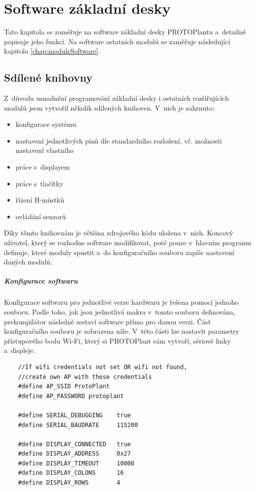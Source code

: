 \chapter{Software základní desky}
Tato kapitola se zaměřuje na software základní desky PROTOPlantu a~detailně popisuje jeho funkci.
Na software ostatních modulů se zaměřuje následu\-jí\-cí kapitola \ref{chap:moduleSoftware}.

\fxnote[author=PŠ]{\textcolor{mygreen}{Přidat pár ukázek kódu.}}


\section{Sdílené knihovny}
Z~důvodu usnadnění programování základní desky i ostatních rozšiřujících modulů jsem vytvořil několik sdílených knihoven. 
V~nich je zahrnuto:
\begin{itemize}
    \item konfigurace systému
    \item nastavení jednotlivých pinů dle standardního rozložení, vč. možnosti nastavení vlastního
    \item práce s~displayem
    \item práce s~tlačítky
    \item řízení H-můstků
    \item ovládání senzorů
\end{itemize}
Díky těmto knihovnám je většina zdrojového kódu uložena v~nich. 
Koncový uživatel, který se rozhodne software modifikovat, poté pouze v~hlavním programu definuje, které moduly spustit a~do konfiguračního souboru zapíše nastavení daných modulů.

\paragraph{Konfigurace softwaru}
Konfigurace softwaru pro jednotlivé verze hardwaru je řešena pomocí jednoho souboru.
Podle toho, jak jsou jednotlivá makra v~tomto souboru definována, prekompilátor následně sestaví software přímo pro danou verzi.
Část konfiguračního souboru je zobrazena níže.
V~této části lze nastavit parametry přístupového bodu Wi-Fi, který si PROTOPlant sám vytvoří, sériové linky a~displeje.
\begin{lstlisting}
    //If wifi credentials not set OR wifi not found, 
    //create own AP with these credentials
    #define AP_SSID ProtoPlant
    #define AP_PASSWORD protoplant
    
    #define SERIAL_DEBUGGING    true
    #define SERIAL_BAUDRATE     115200
    
    #define DISPLAY_CONNECTED   true
    #define DISPLAY_ADDRESS     0x27
    #define DISPLAY_TIMEOUT     10000
    #define DISPLAY_COLONS      16
    #define DISPLAY_ROWS        4
\end{lstlisting}

